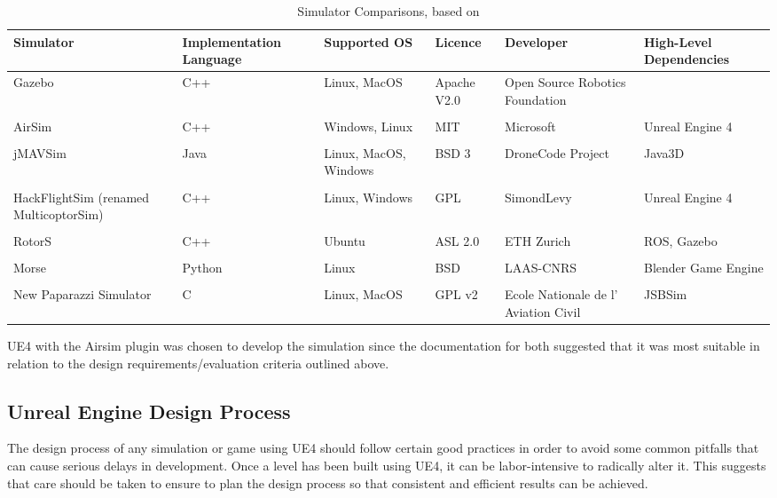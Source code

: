 \begin{center}
\begin{table}
\footnotesize
\centering
\begin{tabular}{ p{2.1cm} p{2.2cm} p{2.1cm} p{2.1cm} p{2.1cm} p{2.1cm}} 
\hline
Simulator & Implementation Language & Supported OS & Licence & Developer & High-Level Dependencies\\
\hline
Gazebo \cite{Koenig2005DesignSimulator} & C++ & Linux, MacOS & Apache V2.0 & Open Source Robotics Foundation & \\
\\
AirSim \cite{Shah2017AirSim:Vehicles} & C++ & Windows, Linux & MIT & Microsoft & Unreal Engine 4\\ 
\\
jMAVSim \cite{jMAVSim} & Java & Linux, MacOS, Windows & BSD 3 & DroneCode Project & Java3D\\
\\
HackFlightSim (renamed MulticoptorSim) \cite{MulticopterSim} & C++ & Linux, Windows & GPL & SimondLevy & Unreal Engine 4 \\
\\
RotorS & C++ & Ubuntu & ASL 2.0 & ETH Zurich & ROS, Gazebo\\
\\
Morse & Python & Linux & BSD & LAAS-CNRS & Blender Game Engine \\
\\
New Paparazzi Simulator & C & Linux, MacOS & GPL v2 & Ecole Nationale de l’ Aviation Civil & JSBSim\\
\hline
\end{tabular}
\caption{Simulator Comparisons, based on \cite{Ebeid2018ASimulators}}
\label{table:SimulatorComparison}
\end{table}
\end{center}

UE4 with the Airsim plugin was chosen to develop the simulation since the documentation for both suggested that it was most suitable in relation to the design requirements/evaluation criteria outlined above.\par

\subsection{Unreal Engine Design Process}
The design process of any simulation or game using UE4 should follow certain good practices in order to avoid some common pitfalls that can cause serious delays in development. Once a level has been built using UE4, it can be labor-intensive to radically alter it\cite[p.~454]{Rouse2005GamePractice}. This suggests that care should be taken to ensure to plan the design process so that consistent and efficient results can be achieved.

